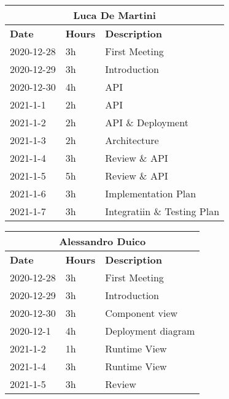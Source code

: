 
\begin{table}[H]
    \centering
    \begin{tabular}{|l|l|l|}
        \multicolumn{3}{c}{\textbf{Luca De Martini}}                   \\
        \hline
        \textbf{Date} & \textbf{Hours} & \textbf{Description}          \\\hline
        2020-12-28    & 3h             & First Meeting       \\\hline
        2020-12-29    & 3h             & Introduction       \\\hline
        2020-12-30    & 4h             & API       \\\hline
        2021-1-1    & 2h             & API       \\\hline
        2021-1-2    & 2h             & API \& Deployment       \\\hline
        2021-1-3    & 2h             & Architecture       \\\hline
        2021-1-4    & 3h             & Review \& API       \\\hline
        2021-1-5    & 5h             & Review \& API       \\\hline
        2021-1-6    & 3h             & Implementation Plan       \\\hline
        2021-1-7    & 3h             & Integratiin \& Testing Plan       \\\hline
    \end{tabular}
\end{table}
\begin{table}[H]
    \centering
    \begin{tabular}{|l|l|l|}
        \multicolumn{3}{c}{\textbf{Alessandro Duico}}                      \\
        \hline
        \textbf{Date} & \textbf{Hours} & \textbf{Description}              \\\hline
        2020-12-28    & 3h             & First Meeting           \\\hline
        2020-12-29    & 3h             & Introduction       \\\hline
        2020-12-30    & 3h             & Component view     \\\hline
        2020-12-1     & 4h             & Deployment diagram \\\hline
        2021-1-2     & 1h             & Runtime View   \\\hline
        2021-1-4     & 3h             & Runtime View   \\\hline
        2021-1-5     & 3h             & Review \\\hline
    \end{tabular}
\end{table}
